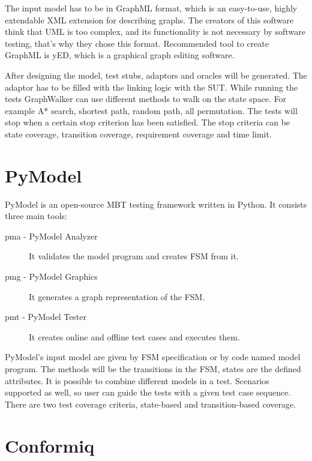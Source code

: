 The input model has to be in GraphML format, which is an easy-to-use, highly extendable XML extension for describing graphs. The creators of this software think that UML is too complex, and its functionality is not necessary by software testing, that's why they chose this format. Recommended tool to create GraphML is yED, which is a graphical graph editing software.

After designing the model, test stubs, adaptors and oracles will be generated. The adaptor has to be filled with the linking logic with the SUT. While running the tests GraphWalker can use different methods to walk on the state space. For example A* search, shortest path, random path, all permutation. The tests will stop when a certain stop criterion has been satisfied. The stop criteria can be state coverage, transition coverage, requirement coverage and time limit.


\section{PyModel}
\label{sec:pymodel}

PyModel \cite{pymodelarticle}\cite{pymodel} is an open-source MBT testing framework written in Python. It consists three main tools:

\begin{description}
	\item[pma - PyModel Analyzer] It validates the model program and creates FSM from it.
	\item[pmg - PyModel Graphics] It generates a graph representation of the FSM.
    	\item[pmt - PyModel Tester] It creates online and offline test cases and executes them.
\end{description}

PyModel's input model are given by FSM specification or by code named model program. The methods will be the transitions in the FSM, states are the defined attributes. It is possible to combine different models in a test. Scenarios supported as well, so user can guide the tests with a given test case sequence. There are two test coverage criteria, state-based and transition-based coverage.


\section{Conformiq}
\label{sec:conformiq}

